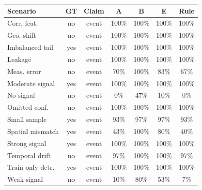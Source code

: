 \begin{tabular}{@{}p{}cccccc@{}}
\toprule
Scenario & GT & Claim & A & B & E & Rule \\
\midrule
Corr. feat. & no & event & 100\% & 100\% & 100\% & 100\% \\
Geo. shift & no & event & 100\% & 100\% & 100\% & 100\% \\
Imbalanced tail & yes & event & 100\% & 100\% & 100\% & 100\% \\
Leakage & no & event & 100\% & 100\% & 100\% & 100\% \\
Meas. error & no & event & 70\% & 100\% & 83\% & 67\% \\
Moderate signal & yes & event & 100\% & 100\% & 100\% & 100\% \\
No signal & no & event & 0\% & 47\% & 10\% & 0\% \\
Omitted conf. & no & event & 100\% & 100\% & 100\% & 100\% \\
Small sample & yes & event & 93\% & 97\% & 97\% & 93\% \\
Spatial mismatch & yes & event & 43\% & 100\% & 80\% & 40\% \\
Strong signal & yes & event & 100\% & 100\% & 100\% & 100\% \\
Temporal drift & no & event & 97\% & 100\% & 100\% & 97\% \\
Train-only detr. & yes & event & 100\% & 100\% & 100\% & 100\% \\
Weak signal & no & event & 10\% & 80\% & 53\% & 7\% \\
\bottomrule
\end{tabular}
